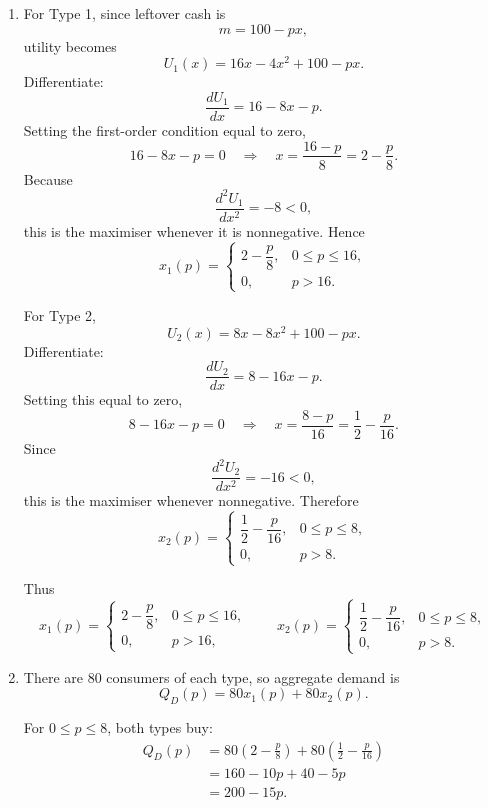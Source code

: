 \documentclass[12pt]{article}
\begin{document}
\begin{enumerate}[label=(\alph*)]
    \item
    For Type 1, since leftover cash is
    \[
    m=100-px,
    \]
    utility becomes
    \[
    U_1(x)=16x-4x^2+100-px.
    \]
    Differentiate:
    \[
    \frac{dU_1}{dx}=16-8x-p.
    \]
    Setting the first-order condition equal to zero,
    \[
    16-8x-p=0
    \quad\Longrightarrow\quad
    x=\frac{16-p}{8}=2-\frac{p}{8}.
    \]
    Because
    \[
    \frac{d^2U_1}{dx^2}=-8<0,
    \]
    this is the maximiser whenever it is nonnegative. Hence
    \[
    x_1(p)=
    \begin{cases}
    2-\dfrac{p}{8}, & 0\le p\le 16,\\[0.6em]
    0, & p>16.
    \end{cases}
    \]

    For Type 2,
    \[
    U_2(x)=8x-8x^2+100-px.
    \]
    Differentiate:
    \[
    \frac{dU_2}{dx}=8-16x-p.
    \]
    Setting this equal to zero,
    \[
    8-16x-p=0
    \quad\Longrightarrow\quad
    x=\frac{8-p}{16}=\frac12-\frac{p}{16}.
    \]
    Since
    \[
    \frac{d^2U_2}{dx^2}=-16<0,
    \]
    this is the maximiser whenever nonnegative. Therefore
    \[
    x_2(p)=
    \begin{cases}
    \dfrac12-\dfrac{p}{16}, & 0\le p\le 8,\\[0.6em]
    0, & p>8.
    \end{cases}
    \]

    Thus
    \[
    \boxed{
    x_1(p)=
    \begin{cases}
    2-\dfrac{p}{8}, & 0\le p\le 16,\\[0.5em]
    0, & p>16,
    \end{cases}
    \qquad
    x_2(p)=
    \begin{cases}
    \dfrac12-\dfrac{p}{16}, & 0\le p\le 8,\\[0.5em]
    0, & p>8.
    \end{cases}}
    \]

    \item
    There are 80 consumers of each type, so aggregate demand is
    \[
    Q_D(p)=80x_1(p)+80x_2(p).
    \]

    For \(0\le p\le 8\), both types buy:
    \begin{align*}
    Q_D(p)
    &=80\left(2-\frac{p}{8}\right)+80\left(\frac12-\frac{p}{16}\right)\\
    &=160-10p+40-5p\\
    &=200-15p.
    \end{align*}


\end{enumerate}
\end{document}
